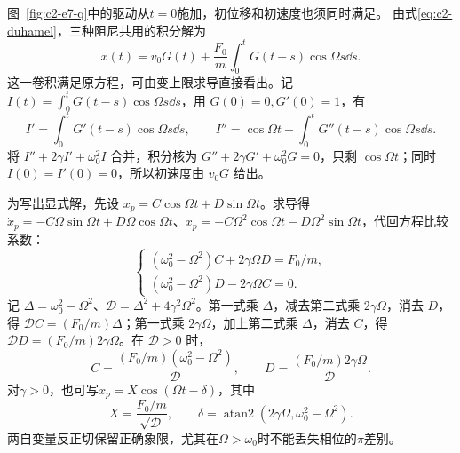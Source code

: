 \begin{solution}
图~\ref{fig:c2-e7-q}中的驱动从$t=0$施加，初位移和初速度也须同时满足。
由式\eqref{eq:c2-duhamel}，三种阻尼共用的积分解为
\[
 \boxed{x(t)=v_0G(t)+\frac{F_0}{m}
 \int_0^tG(t-s)\cos\Omega s\dd s}.
\]
这一卷积满足原方程，可由变上限求导直接看出。记 $I(t)=\int_0^tG(t-s)\cos\Omega s\dd s$，用 $G(0)=0,G'(0)=1$，有
\[
I'=\int_0^tG'(t-s)\cos\Omega s\dd s,\qquad
I''=\cos\Omega t+\int_0^tG''(t-s)\cos\Omega s\dd s.
\]
将 $I''+2\gamma I'+\omega_0^2I$ 合并，积分核为 $G''+2\gamma G'+\omega_0^2G=0$，只剩 $\cos\Omega t$；同时 $I(0)=I'(0)=0$，所以初速度由 $v_0G$ 给出。

为写出显式解，先设 $x_p=C\cos\Omega t+D\sin\Omega t$。求导得 $\dot x_p=-C\Omega\sin\Omega t+D\Omega\cos\Omega t$、$\ddot x_p=-C\Omega^2\cos\Omega t-D\Omega^2\sin\Omega t$，代回方程比较系数：
\[
 \begin{cases}
 (\omega_0^2-\Omega^2)C+2\gamma\Omega D=F_0/m,\\
 (\omega_0^2-\Omega^2)D-2\gamma\Omega C=0.
 \end{cases}
\]
记 $\Delta=\omega_0^2-\Omega^2$、$\mathcal D=\Delta^2+4\gamma^2\Omega^2$。第一式乘 $\Delta$，减去第二式乘 $2\gamma\Omega$，消去 $D$，得 $\mathcal DC=(F_0/m)\Delta$；第一式乘 $2\gamma\Omega$，加上第二式乘 $\Delta$，消去 $C$，得 $\mathcal DD=(F_0/m)2\gamma\Omega$。在 $\mathcal D>0$ 时，
\[
 C=\frac{(F_0/m)(\omega_0^2-\Omega^2)}{\mathcal D},\qquad
 D=\frac{(F_0/m)2\gamma\Omega}{\mathcal D}.
\]
对$\gamma>0$，也可写$x_p=X\cos(\Omega t-\delta)$，其中
\[
 X=\frac{F_0/m}{\sqrt{\mathcal D}},\qquad
 \delta=\operatorname{atan2}(2\gamma\Omega,\omega_0^2-\Omega^2).
\]
两自变量反正切保留正确象限，尤其在$\Omega>\omega_0$时不能丢失相位的$\pi$差别。
\begin{figure}[H]\centering
\begin{tikzpicture}[>=Stealth,line cap=round,line join=round]

\end{tikzpicture}
\end{figure}
\end{solution}
